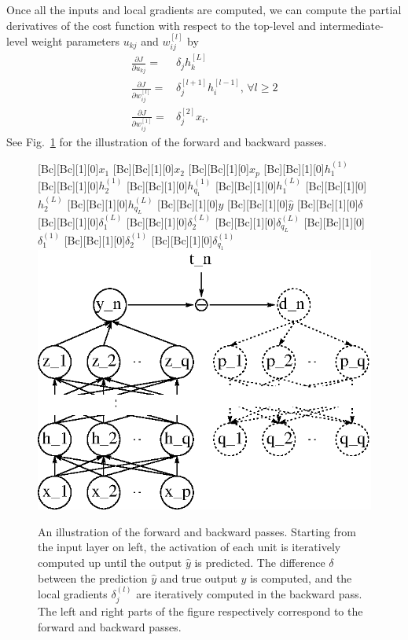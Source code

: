 \documentclass{now}
\newcommand{\qlay}[1]{\left[#1\right]}
\begin{document}
Once all the inputs and local gradients are computed, we can compute the partial
derivatives of the cost function with respect to the top-level and
intermediate-level weight parameters $u_{kj}$ and $w_{ij}^{\qlay{l}}$ by
\begin{align*}
    \frac{\partial J}{\partial u_{kj}} =& \delta_j
    h_k^{\qlay{L}}
    \nonumber \\
    \frac{\partial J}{\partial w_{ij}^{\qlay{l}}} =&
    \delta_j^{\qlay{l+1}} h_i^{\qlay{l-1}} \text{, }\forall l \geq 2 
    \nonumber \\
    \frac{\partial J}{\partial w_{ij}^{\qlay{1}}} =&
    \delta_j^{\qlay{2}} x_i.
\end{align*}
See Fig.~\ref{fig:backprop} for the illustration of the forward and backward
passes.

\begin{figure}[t]
    \centering
    [Bc][Bc][1][0]{$x_1$}
    [Bc][Bc][1][0]{$x_2$}
    [Bc][Bc][1][0]{$x_p$}
    [Bc][Bc][1][0]{$h^{(1)}_1$}
    [Bc][Bc][1][0]{$h^{(1)}_2$}
    [Bc][Bc][1][0]{$h^{(1)}_{q_1}$}
    [Bc][Bc][1][0]{$h^{(L)}_1$}
    [Bc][Bc][1][0]{$h^{(L)}_2$}
    [Bc][Bc][1][0]{$h^{(L)}_{q_L}$}
    [Bc][Bc][1][0]{$y$}
    [Bc][Bc][1][0]{$\hat{y}$}
    [Bc][Bc][1][0]{$\delta$}
    [Bc][Bc][1][0]{$\delta^{(L)}_1$}
    [Bc][Bc][1][0]{$\delta^{(L)}_2$}
    [Bc][Bc][1][0]{$\delta^{(L)}_{q_L}$}
    [Bc][Bc][1][0]{$\delta^{(1)}_1$}
    [Bc][Bc][1][0]{$\delta^{(1)}_2$}
    [Bc][Bc][1][0]{$\delta^{(1)}_{q_1}$}
    \includegraphics[width=0.75\columnwidth]{../figures/mlp_bp.eps}
    \caption{An illustration of the forward and backward passes. Starting from
        the input layer on left, the activation of each unit is iteratively
        computed up until the output $\hat{y}$ is predicted. The difference
        $\delta$ between the prediction $\hat{y}$ and true output $y$ is
        computed, and the local gradients $\delta_j^{(l)}$ are iteratively
        computed in the backward pass. The left and right parts of the figure
        respectively correspond to the forward and backward passes.}
    \label{fig:backprop}
\end{figure}
\end{document}
